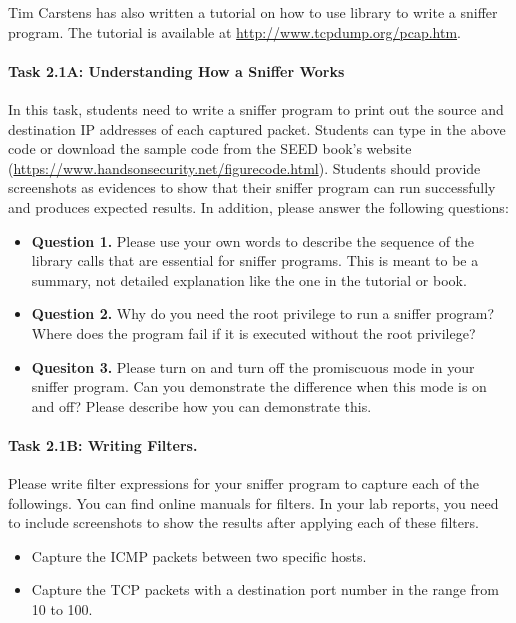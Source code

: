 Tim Carstens has also written a tutorial on how to use 
\pcap library to write a sniffer program. The tutorial is 
available at \url{http://www.tcpdump.org/pcap.htm}.  
 

\paragraph{Task 2.1A: Understanding How a Sniffer Works}
In this task, students need to write a sniffer program to 
print out the source and destination IP addresses of each captured 
packet. Students can type in the above code or download the sample code from the 
SEED book's website (\url{https://www.handsonsecurity.net/figurecode.html}). 
Students should provide screenshots as evidences to show that their sniffer
program can run successfully and produces expected 
results. In addition, please answer the following questions:

\begin{itemize}
\item \textbf{Question 1.} Please use your own words to describe the sequence of the 
library calls that are essential for sniffer programs. This 
is meant to be a summary, not detailed explanation like the 
one in the tutorial or book.
 
\item \textbf{Question 2.} Why do you need the root privilege to run a sniffer program? Where
does the program fail if it is executed without the root privilege?


\item \textbf{Quesiton 3.} Please turn on and turn off the promiscuous mode in your sniffer
program. Can you demonstrate the difference when this mode is on and off? Please describe how
you can demonstrate this.
\end{itemize}


\paragraph{Task 2.1B: Writing Filters.}
Please write filter expressions for your sniffer program 
to capture each of the followings. You can find online 
manuals for \pcap filters.
In your lab reports, you need to include screenshots to show
the results after applying each of these filters. 
\begin{itemize}
\item Capture the ICMP packets between two specific hosts.
\item Capture the TCP packets with a destination port number 
      in the range from 10 to 100.  
\end{itemize}



